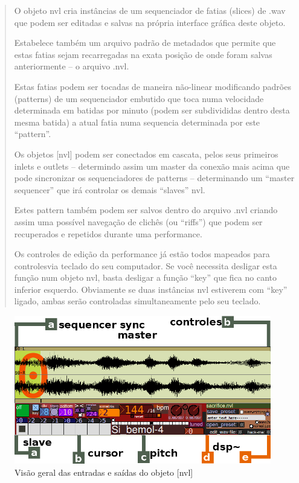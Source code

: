 \documentclass{ppgmus}
\begin{document}
\begin{quotation}
 O objeto nvl cria instâncias de um sequenciador de fatias (slices) de .wav que podem ser editadas e salvas na 
própria interface gráfica deste objeto.

Estabelece também um arquivo padrão de metadados que permite que estas fatias sejam recarregadas na 
exata posição de onde foram salvas anteriormente – o arquivo .nvl.

Estas fatias podem ser tocadas de maneira não-linear modificando padrões (patterns) de um sequenciador 
embutido que toca numa velocidade determinada em batidas por minuto (podem ser subdivididas dentro desta 
mesma batida) a atual fatia numa sequencia determinada por este “pattern”.

Os objetos [nvl] podem ser conectados em cascata, pelos seus primeiros inlets e outlets – determindo 
assim um master da conexão mais acima que pode sincronizar os sequenciadores de patterns – determinando um 
“master sequencer” que irá controlar os demais “slaves” nvl.

Estes pattern também podem ser salvos dentro do arquivo .nvl criando assim uma possível navegação de clichês 
(ou “riffs”) que podem ser recuperados e repetidos durante uma performance.

Os controles de edição da performance já estão todos mapeados para controlesvia teclado do seu computador. 
Se você necessita desligar esta função num objeto nvl, basta desligar a função “key” que fica no canto inferior 
esquerdo. Obviamente se duas instâncias nvl estiverem com “key” ligado, ambas serão controladas simultaneamente 
pelo seu teclado.
\end{quotation} 

\begin{figure}[-h]
\includegraphics[scale=.6]{nvl1}
\caption{Visão geral das entradas e saídas do objeto [nvl]}
\label{nvl1}
\end{figure}
\end{document}
